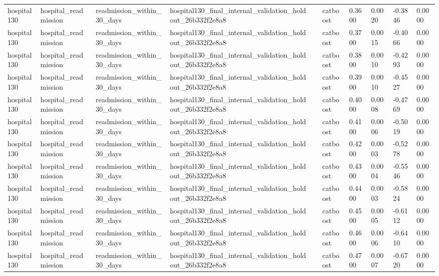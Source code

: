 \begin{tabular}{llllllllll}
hospital130 & hospital\_readmission & readmission\_within\_30\_days & hospital130\_final\_internal\_validation\_holdout\_26b332f2e8a8 &  & catboost & 0.3600 & 0.0020 & -0.3846 & 0.0000 \\
hospital130 & hospital\_readmission & readmission\_within\_30\_days & hospital130\_final\_internal\_validation\_holdout\_26b332f2e8a8 &  & catboost & 0.3700 & 0.0015 & -0.4066 & 0.0000 \\
hospital130 & hospital\_readmission & readmission\_within\_30\_days & hospital130\_final\_internal\_validation\_holdout\_26b332f2e8a8 &  & catboost & 0.3800 & 0.0010 & -0.4293 & 0.0000 \\
hospital130 & hospital\_readmission & readmission\_within\_30\_days & hospital130\_final\_internal\_validation\_holdout\_26b332f2e8a8 &  & catboost & 0.3900 & 0.0010 & -0.4527 & 0.0000 \\
hospital130 & hospital\_readmission & readmission\_within\_30\_days & hospital130\_final\_internal\_validation\_holdout\_26b332f2e8a8 &  & catboost & 0.4000 & 0.0008 & -0.4769 & 0.0000 \\
hospital130 & hospital\_readmission & readmission\_within\_30\_days & hospital130\_final\_internal\_validation\_holdout\_26b332f2e8a8 &  & catboost & 0.4100 & 0.0006 & -0.5019 & 0.0000 \\
hospital130 & hospital\_readmission & readmission\_within\_30\_days & hospital130\_final\_internal\_validation\_holdout\_26b332f2e8a8 &  & catboost & 0.4200 & 0.0003 & -0.5278 & 0.0000 \\
hospital130 & hospital\_readmission & readmission\_within\_30\_days & hospital130\_final\_internal\_validation\_holdout\_26b332f2e8a8 &  & catboost & 0.4300 & 0.0004 & -0.5546 & 0.0000 \\
hospital130 & hospital\_readmission & readmission\_within\_30\_days & hospital130\_final\_internal\_validation\_holdout\_26b332f2e8a8 &  & catboost & 0.4400 & 0.0003 & -0.5824 & 0.0000 \\
hospital130 & hospital\_readmission & readmission\_within\_30\_days & hospital130\_final\_internal\_validation\_holdout\_26b332f2e8a8 &  & catboost & 0.4500 & 0.0005 & -0.6112 & 0.0000 \\
hospital130 & hospital\_readmission & readmission\_within\_30\_days & hospital130\_final\_internal\_validation\_holdout\_26b332f2e8a8 &  & catboost & 0.4600 & 0.0006 & -0.6410 & 0.0000 \\
hospital130 & hospital\_readmission & readmission\_within\_30\_days & hospital130\_final\_internal\_validation\_holdout\_26b332f2e8a8 &  & catboost & 0.4700 & 0.0007 & -0.6720 & 0.0000 \\

\end{tabular}
